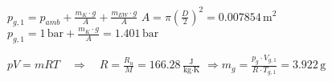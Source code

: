 \( p_{g,1} = p_{amb} + \frac{m_{K} \cdot g}{A} + \frac{m_{EW} \cdot g}{A} \)  
\( A = \pi \left(\frac{D}{2}\right)^2 = 0.007854 \, \text{m}^2 \)  
\( p_{g,1} = 1 \, \text{bar} + \frac{m_{K} \cdot g}{A} = 1.401 \, \text{bar} \)  

\( pV = mRT \quad \Rightarrow \quad R = \frac{R_u}{M} = 166.28 \, \frac{\text{J}}{\text{kg·K}} \)  
\( \Rightarrow m_{g} = \frac{p_{g} \cdot V_{g,1}}{R \cdot T_{g,1}} = 3.922 \, \text{g} \)